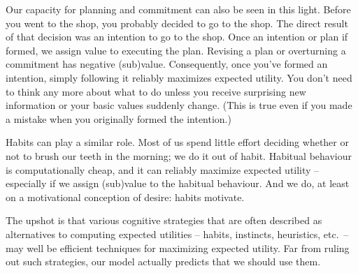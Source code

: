 
Our capacity for planning and commitment can also be seen in this
light. Before you went to the shop, you probably decided to go to the
shop. The direct result of that decision was an intention to go to the
shop.%
%
%
Once an intention or plan if formed, we assign value to executing the
plan. Revising a plan or overturning a commitment has negative
(sub)value. Consequently, once you've formed an intention, simply
following it reliably maximizes expected utility. You don't need to
think any more about what to do unless you receive surprising new
information or your basic values suddenly change. (This is true even if
you made a mistake when you originally formed the intention.)

Habits can play a similar role. Most of us spend little effort
deciding whether or not to brush our teeth in the morning; we do it
out of habit. Habitual behaviour is computationally cheap, and it can
reliably maximize expected utility -- especially if we assign
(sub)value to the habitual behaviour. And we do, at least on a
motivational conception of desire: habits motivate.

The upshot is that various cognitive strategies that are often
described as alternatives to computing expected utilities -- habits,
instincts, heuristics, etc.\ -- may well be efficient
techniques for maximizing expected utility. Far from ruling out such
strategies, our model actually predicts that we should use them.


